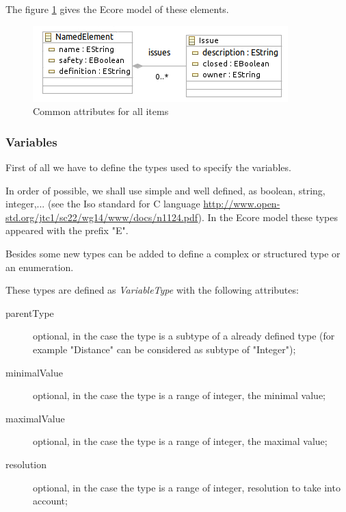 The figure \ref{fig:Common} gives the Ecore model of these elements.

\begin{figure}[ht]
  \centering
  \includegraphics{DataModel/Common2.png}
  \caption{Common attributes for all items}
  \label{fig:Common}
\end{figure}


\subsubsection{Variables}
\label{sec:var}


First of all we have to define the types used to specify the variables.

In order of possible, we shall use simple and well defined, as boolean, string, integer,... (see the Iso standard for C language \url{http://www.open-std.org/jtc1/sc22/wg14/www/docs/n1124.pdf}). In the Ecore model these types appeared with the prefix "E".

Besides some new types can be added to define a complex or structured type or an enumeration.

These types are defined as \textit{VariableType} with the following attributes:
\begin{description}
\item[parentType] optional, in the case the type is a subtype of a  already defined type (for example "Distance" can be considered as subtype of "Integer");
\item[minimalValue] optional, in the case the type is a range of integer, the minimal value;
\item[maximalValue] optional, in the case the type is a range of integer, the maximal value;
\item[resolution] optional, in the case the type is a range of integer, resolution to take into account;
\end{description}

